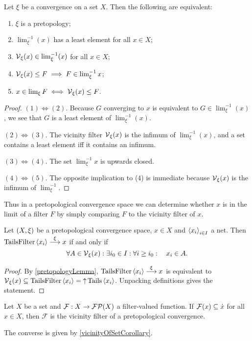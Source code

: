 \begin{lemma} \label{pretopologyLemma}
Let $\xi$ be a convergence on a set $X$. Then the following are equivalent:
\begin{enumerate}
\item $\xi$ is a pretopology;
\item $\lim_\xi^{-1}(x)$ has a least element for all $x\in X$;
\item $\operatorname{\mathcal{V}}_\xi(x) \in \lim_\xi^{-1}(x)$ for all $x\in X$;
\item $\operatorname{\mathcal{V}}_\xi(x) \leq F \implies F\in\lim^{-1}_\xi x$;
\item $x\in\lim_\xi F \iff \operatorname{\mathcal{V}}_\xi(x) \leq F$.
\end{enumerate}
\end{lemma}
\begin{proof}
$(1) \Leftrightarrow (2)$. Because $G$ converging to $x$ is equivalent to $G\in \lim_\xi^{-1}(x)$, we see that $G$ is a least element of $\lim_\xi^{-1}(x)$.

$(2) \Leftrightarrow (3)$. The vicinity filter $\operatorname{\mathcal{V}}_\xi(x)$ is the infimum of $\lim_\xi^{-1}(x)$, and a set contains a least element iff it contains an infimum.

$(3) \Leftrightarrow (4)$. The set $\lim^{-1}_\xi x$ is upwards closed.

$(4) \Leftrightarrow (5)$. The opposite implication to (4) is immediate because $\operatorname{\mathcal{V}}_\xi(x)$ is the infimum of $\lim^{-1}_\xi$.
\end{proof}
Thus in a pretopological convergence space we can determine whether $x$ is in the limit of a filter $F$ by simply comparing $F$ to the vicinity filter of $x$.

\begin{lemma} \label{pretopologicalNetConvergence}
Let $\left( X,\xi \right)$ be a pretopological convergence space, $x\in X$ and $\left\langle x_i \right\rangle_{i\in I}$ a net. Then $\operatorname{TailsFilter}\left\langle x_i \right\rangle \overset{\xi}{\longrightarrow} x$ \textup{if and only if}
\[ \forall A\in \operatorname{\mathcal{V}}_\xi(x): \exists i_0\in I: \forall i \geq i_0: \quad x_i\in A. \]
\end{lemma}
\begin{proof}
By \ref{pretopologyLemma}, $\operatorname{TailsFilter}\left\langle x_i \right\rangle \overset{\xi}{\longrightarrow} x$ is equivalent to $\operatorname{\mathcal{V}}_\xi(x) \subseteq \operatorname{TailsFilter}\left\langle x_i \right\rangle = \operatorname{\uparrow} \operatorname{Tails}\left\langle x_i \right\rangle$. Unpacking definitions gives the statement.
\end{proof}

\begin{lemma} \label{filterFunctionToPretopology}
Let $X$ be a set and $\mathcal{F}:X\to \operatorname{\mathcal{FP}}(X)$ a filter-valued function. If $\mathcal{F}(x) \subseteq \dot{x}$ for all $x\in X$, then $\mathcal{F}$ is the vicinity filter of a pretopological convergence.
\end{lemma}
The converse is given by \ref{vicinityOfSetCorollary}.

